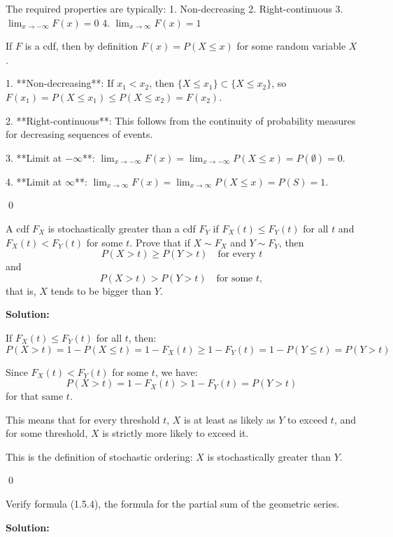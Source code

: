 The required properties are typically:
1. Non-decreasing
2. Right-continuous
3. $\lim_{x \to -\infty} F(x) = 0$
4. $\lim_{x \to \infty} F(x) = 1$

If $F$ is a cdf, then by definition $F(x) = P(X \leq x)$ for some random variable $X$.

1. **Non-decreasing**: If $x_1 < x_2$, then $\{X \leq x_1\} \subset \{X \leq x_2\}$, so $F(x_1) = P(X \leq x_1) \leq P(X \leq x_2) = F(x_2)$.

2. **Right-continuous**: This follows from the continuity of probability measures for decreasing sequences of events.

3. **Limit at $-\infty$**: $\lim_{x \to -\infty} F(x) = \lim_{x \to -\infty} P(X \leq x) = P(\emptyset) = 0$.

4. **Limit at $\infty$**: $\lim_{x \to \infty} F(x) = \lim_{x \to \infty} P(X \leq x) = P(S) = 1$.



\qed
\begin{problembox}
A cdf $F_{X}$ is stochastically greater than a cdf $F_{Y}$ if $F_{X}(t)\leq F_{Y}(t)$ for all $t$ and $F_{X}(t)<F_{Y}(t)$ for some $t$. Prove that if $X\sim F_{X}$ and $Y\sim F_{Y}$, then
\[ P(X>t)\geq P(Y>t)\quad\text{for every }t \]
and
\[ P(X>t)>P(Y>t)\quad\text{for some }t, \]
that is, $X$ tends to be bigger than $Y$.
\end{problembox}

\noindent\textbf{Solution:}

If $F_X(t) \leq F_Y(t)$ for all $t$, then:
\[ P(X > t) = 1 - P(X \leq t) = 1 - F_X(t) \geq 1 - F_Y(t) = 1 - P(Y \leq t) = P(Y > t) \]

Since $F_X(t) < F_Y(t)$ for some $t$, we have:
\[ P(X > t) = 1 - F_X(t) > 1 - F_Y(t) = P(Y > t) \]
for that same $t$.

This means that for every threshold $t$, $X$ is at least as likely as $Y$ to exceed $t$, and for some threshold, $X$ is strictly more likely to exceed it.

This is the definition of stochastic ordering: $X$ is stochastically greater than $Y$.



\qed
\begin{problembox}
Verify formula (1.5.4), the formula for the partial sum of the geometric series.
\end{problembox}

\noindent\textbf{Solution:}

